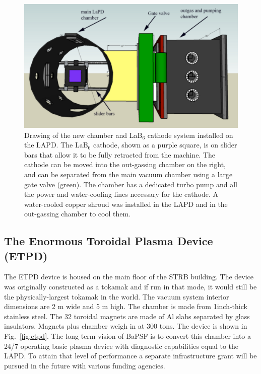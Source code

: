 \documentclass[11pt]{article}
\begin{document}
\begin{figure}[htbp] %
   \centering
   \includegraphics[width=6in]{lab6cartoon.jpg} 
   \caption{Drawing of the new chamber and LaB$_{6}$ cathode system installed on the LAPD.  The LaB$_{6}$ cathode, shown as a purple square, is on slider bars that allow it to be fully retracted from the machine.  The cathode can be moved into the out-gassing chamber on the right, and can be separated from the main vacuum chamber using a large gate valve (green).  The chamber has a dedicated turbo pump and all the power and water-cooling lines necessary for the cathode.  A water-cooled copper shroud was installed in the LAPD and in the out-gassing chamber to cool them.}
   \label{fig:lab6cartoon}
\end{figure}
		
		


\subsection{The Enormous Toroidal Plasma Device (ETPD)}
The ETPD device is housed on the main floor of the STRB building.  The device was originally constructed as a tokamak and if run in that mode, it would still be the physically-largest tokamak in the world.  The vacuum system interior dimensions are 2 m wide and 5 m high.  The chamber is made from 1inch-thick stainless steel.  The 32 toroidal magnets are made of Al slabs separated by glass insulators.  Magnets plus chamber weigh in at 300 tons. The device is shown in Fig.\ \ref{fig:etpd}.   The long-term vision of BaPSF is to convert this chamber into a 24/7 operating basic plasma device with diagnostic capabilities equal to the LAPD. To attain that level of performance a separate infrastructure grant will be pursued in the future with various funding agencies. 
\end{document}
